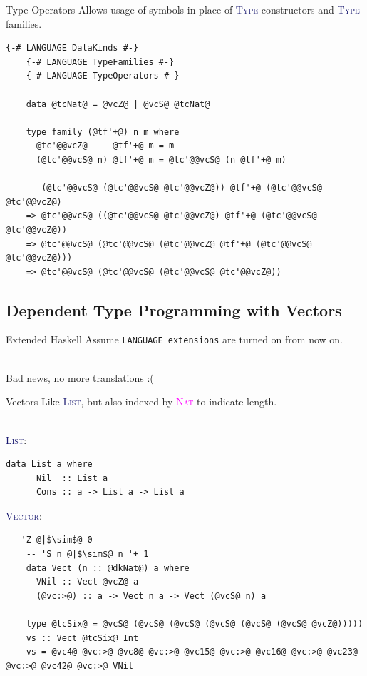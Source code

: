\documentclass[xcolor={usenames,dvipsnames}]{beamer}
\newcommand{\htycon}[1]{\textcolor{MidnightBlue}{\textsc{#1}}}
\newcommand{\hkind}[1]{\textcolor{Fuchsia}{\textsc{#1}}}
\begin{document}
\begin{frame}[fragile]{Type Operators}
  Allows usage of symbols in place of \htycon{Type} constructors and \htycon{Type} families.

  \begin{lstlisting}[style=hask]
    {-# LANGUAGE DataKinds #-}
    {-# LANGUAGE TypeFamilies #-}
    {-# LANGUAGE TypeOperators #-}

    data @tcNat@ = @vcZ@ | @vcS@ @tcNat@

    type family (@tf'+@) n m where
      @tc'@@vcZ@     @tf'+@ m = m
      (@tc'@@vcS@ n) @tf'+@ m = @tc'@@vcS@ (n @tf'+@ m)

       (@tc'@@vcS@ (@tc'@@vcS@ @tc'@@vcZ@)) @tf'+@ (@tc'@@vcS@ @tc'@@vcZ@)
    => @tc'@@vcS@ ((@tc'@@vcS@ @tc'@@vcZ@) @tf'+@ (@tc'@@vcS@ @tc'@@vcZ@))
    => @tc'@@vcS@ (@tc'@@vcS@ (@tc'@@vcZ@ @tf'+@ (@tc'@@vcS@ @tc'@@vcZ@)))
    => @tc'@@vcS@ (@tc'@@vcS@ (@tc'@@vcS@ @tc'@@vcZ@))
  \end{lstlisting}
\end{frame}


\subsection{Dependent Type Programming with Vectors}

\begin{frame}[fragile]{Extended Haskell}
  Assume \texttt{LANGUAGE extensions} are turned on from now on.

  \ \\
  Bad news, no more translations :(
\end{frame}

\begin{frame}[fragile]{Vectors}
  Like \htycon{List}, but also indexed by \hkind{Nat} to indicate length.

  \ \\
  \htycon{List}:
  \begin{lstlisting}[style=hask]
    data List a where
      Nil  :: List a
      Cons :: a -> List a -> List a
  \end{lstlisting}

  \htycon{Vector}:
  \begin{lstlisting}[style=hask]
    -- 'Z @|$\sim$@ 0
    -- 'S n @|$\sim$@ n '+ 1
    data Vect (n :: @dkNat@) a where
      VNil :: Vect @vcZ@ a
      (@vc:>@) :: a -> Vect n a -> Vect (@vcS@ n) a

    type @tcSix@ = @vcS@ (@vcS@ (@vcS@ (@vcS@ (@vcS@ (@vcS@ @vcZ@)))))
    vs :: Vect @tcSix@ Int
    vs = @vc4@ @vc:>@ @vc8@ @vc:>@ @vc15@ @vc:>@ @vc16@ @vc:>@ @vc23@ @vc:>@ @vc42@ @vc:>@ VNil
  \end{lstlisting}
\end{frame}
\end{document}
